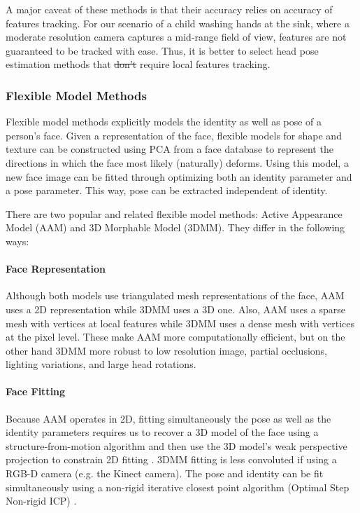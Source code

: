 \documentclass{ut-thesis}
\providecommand{\DIFaddtex}[1]{{\protect\color{blue}\uwave{#1}}} %
\providecommand{\DIFdeltex}[1]{{\protect\color{red}\sout{#1}}}                      %
\providecommand{\DIFaddbegin}{} %
\providecommand{\DIFaddend}{} %
\providecommand{\DIFdelbegin}{} %
\providecommand{\DIFdelend}{} %
\providecommand{\DIFadd}[1]{\texorpdfstring{\DIFaddtex{#1}}{#1}} %
\providecommand{\DIFdel}[1]{\texorpdfstring{\DIFdeltex{#1}}{}} %
\begin{document}
A major caveat of these methods is that their accuracy relies on accuracy of features tracking.  For our scenario of a child washing hands at the sink, where a moderate resolution camera captures a mid-range field of view, features are not guaranteed to be tracked with ease.  Thus, it is better to select head pose estimation methods that \DIFdelbegin \DIFdel{don't }\DIFdelend \DIFaddbegin \DIFadd{do not }\DIFaddend require local features tracking.


\subsubsection{Flexible Model Methods}
Flexible model methods explicitly models the identity as well as pose of a person's face.  Given a representation of the face, flexible models for shape and texture can be constructed using PCA from a face database to represent the directions in which the face most likely (naturally) deforms.  Using this model, a new face image can be fitted through optimizing both an identity parameter and a pose parameter.  This way, pose can be extracted independent of identity.


There are two popular and related flexible model methods: Active Appearance Model (AAM) and 3D Morphable Model (3DMM).  They differ in the following ways:

\paragraph{Face Representation}
Although both models use triangulated mesh representations of the face, AAM uses a 2D representation while 3DMM uses a 3D one.  Also, AAM uses a sparse mesh with vertices at local features while 3DMM uses a dense mesh with vertices at the pixel level.  These make AAM more computationally efficient, but on the other hand 3DMM more robust to low resolution image, partial occlusions, lighting variations, and large head rotations.


\paragraph{Face Fitting}
Because AAM operates in 2D, fitting simultaneously the pose as well as the identity parameters requires us to recover a 3D model of the face using a structure-from-motion algorithm and then use the 3D model's weak perspective projection to constrain 2D fitting \cite{xiao2004real}.  3DMM fitting is less convoluted if using a RGB-D camera (e.g. the Kinect camera).  The pose and identity can be fit simultaneously using a non-rigid iterative closest point algorithm (Optimal Step Non-rigid ICP) \cite{paysan20093d}.
\end{document}
